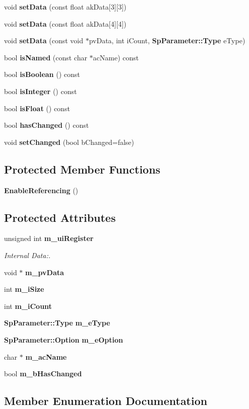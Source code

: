 \begin{CompactItemize}
void {\bf set\-Data} (const float ak\-Data[3][3])
\item 
void {\bf set\-Data} (const float ak\-Data[4][4])
\item 
void {\bf set\-Data} (const void $\ast$pv\-Data, int i\-Count, {\bf Sp\-Parameter::Type} e\-Type)
\item 
bool {\bf is\-Named} (const char $\ast$ac\-Name) const
\item 
bool {\bf is\-Boolean} () const
\item 
bool {\bf is\-Integer} () const
\item 
bool {\bf is\-Float} () const
\item 
bool {\bf has\-Changed} () const
\item 
void {\bf set\-Changed} (bool b\-Changed=false)
\end{CompactItemize}
\subsection*{Protected Member Functions}
\begin{CompactItemize}
\item 
{\bf Enable\-Referencing} ()
\end{CompactItemize}
\subsection*{Protected Attributes}
\begin{CompactItemize}
\item 
unsigned int {\bf m\_\-ui\-Register}
\begin{CompactList}\small\item\em Internal Data:. \item\end{CompactList}\item 
void $\ast$ {\bf m\_\-pv\-Data}
\item 
int {\bf m\_\-i\-Size}
\item 
int {\bf m\_\-i\-Count}
\item 
{\bf Sp\-Parameter::Type} {\bf m\_\-e\-Type}
\item 
{\bf Sp\-Parameter::Option} {\bf m\_\-e\-Option}
\item 
char $\ast$ {\bf m\_\-ac\-Name}
\item 
bool {\bf m\_\-b\-Has\-Changed}
\end{CompactItemize}


\subsection{Member Enumeration Documentation}
